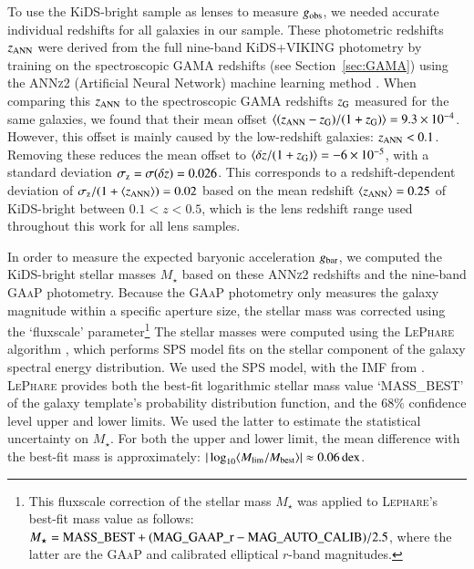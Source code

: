 \documentclass{aa}
\newcommand{\dex}{\,{\rm dex}}
\newcommand*{\meanb}[1]{\langle{#1}\rangle}
\newcommand*{\E}[1]{\times 10^{#1}}
\newcommand{\un}[1]{_{\rm #1}}
\begin{document}
To use the KiDS-bright sample as lenses to measure $g\un{obs}$, we needed accurate individual redshifts for all galaxies in our sample. These photometric redshifts $z\un{ANN}$ were derived from the full nine-band KiDS+VIKING photometry by training on the spectroscopic GAMA redshifts (see Section~\ref{sec:GAMA}) using the \textsc{ANNz2} (Artificial Neural Network) machine learning method \cite[]{sadeh2016}. When comparing this $z\un{ANN}$ to the spectroscopic GAMA redshifts $z\un{G}$ measured for the same galaxies, we found that their mean offset $\meanb{(z\un{ANN} - z\un{G})/(1+z\un{G})} = 9.3\E{-4}$. However, this offset is mainly caused by the low-redshift galaxies: $z\un{ANN}<0.1$. Removing these reduces the mean offset to $\meanb{\delta z/(1+z\un{G})} = -6\E{-5}$, with a standard deviation $\sigma\un{z} = \sigma(\delta z) = 0.026$. This corresponds to a redshift-dependent deviation of $\sigma\un{z}/(1+\meanb{z\un{ANN}})=0.02$ based on the mean redshift $\meanb{z\un{ANN}} = 0.25$ of KiDS-bright between $0.1<z<0.5$, which is the lens redshift range used throughout this work for all lens samples.

In order to measure the expected baryonic acceleration $g\un{bar}$, we computed the KiDS-bright stellar masses $M_\star$ based on these \textsc{ANNz2} redshifts and the nine-band \textsc{GAaP} photometry. Because the \textsc{GAaP} photometry only measures the galaxy magnitude within a specific aperture size, the stellar mass was corrected using the `fluxscale' parameter\footnote{This fluxscale correction of the stellar mass $M_\star$ was applied to \textsc{Lephare}'s best-fit mass value as follows: $M_\star = {\rm MASS\_BEST} + ({\rm MAG\_GAAP\_r} - {\rm MAG\_AUTO\_CALIB}) / 2.5$, where the latter are the \textsc{GAaP} and calibrated elliptical $r$-band magnitudes.} The stellar masses were computed using the \textsc{LePhare} algorithm \cite[]{arnouts1999, ilbert2006}, which performs SPS model fits on the stellar component of the galaxy spectral energy distribution. We used the \cite{bruzual2003} SPS model, with the IMF from \citet[][equal to those used for the GAMA stellar masses]{chabrier2003}. \textsc{LePhare} provides both the best-fit logarithmic stellar mass value `MASS\_BEST' of the galaxy template's probability distribution function, and the $68\%$ confidence level upper and lower limits. We used the latter to estimate the statistical uncertainty on $M_\star$. For both the upper and lower limit, the mean difference with the best-fit mass is approximately: $|\log_{10}\meanb{M\un{lim}/M\un{best}}| \approx 0.06 \dex$.
\end{document}
